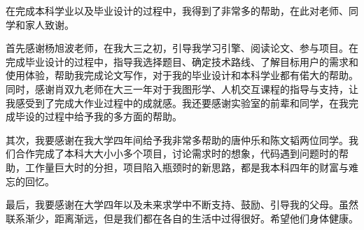 \begin{thanks}

  在完成本科学业以及毕业设计的过程中，我得到了非常多的帮助，在此对老师、同学和家人致谢。
  
  首先感谢杨旭波老师，在我大三之初，引导我学习引擎、阅读论文、参与项目。在完成毕业设计的过程中，指导我选择题目、确定技术路线、了解目标用户的需求和使用体验，帮助我完成论文写作，对于我的毕业设计和本科学业都有偌大的帮助。同时，感谢肖双九老师在大三一年对于我图形学、人机交互课程的指导与支持，让我感受到了完成大作业过程中的成就感。我还要感谢实验室的前辈和同学，在我完成毕设的过程中给予我的多方面的帮助。

  其次，我要感谢在我大学四年间给予我非常多帮助的唐仲乐和陈文韬两位同学。我们合作完成了本科大大小小多个项目，讨论需求时的想象，代码遇到问题时的帮助，工作量巨大时的分担，项目陷入瓶颈时的新思路，都是我本科四年的财富与难忘的回忆。
  
  最后，我要感谢在大学四年以及未来求学中不断支持、鼓励、引导我的父母。虽然联系渐少，距离渐远，但是我们都在各自的生活中过得很好。希望他们身体健康。
    
\end{thanks}

